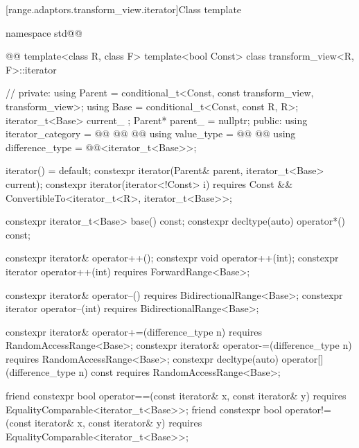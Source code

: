 [range.adaptors.transform_view.iterator]{Class template }

\pnum
{}

\begin{codeblock}
namespace std@@ { @@
  template<class R, class F>
  template<bool Const>
  class transform_view<R, F>::iterator { // \expos
  private:
    using Parent = conditional_t<Const, const transform_view, transform_view>;
    using Base   = conditional_t<Const, const R, R>;
    iterator_t<Base> current_ {};
    Parent* parent_ = nullptr;
  public:
    using iterator_category =
      @@
      @@
    @@
    using value_type        =
      @@
      @@
    using difference_type   = @@<iterator_t<Base>>;

    iterator() = default;
    constexpr iterator(Parent& parent, iterator_t<Base> current);
    constexpr iterator(iterator<!Const> i)
      requires Const && ConvertibleTo<iterator_t<R>, iterator_t<Base>>;

    constexpr iterator_t<Base> base() const;
    constexpr decltype(auto) operator*() const;

    constexpr iterator& operator++();
    constexpr void operator++(int);
    constexpr iterator operator++(int) requires ForwardRange<Base>;

    constexpr iterator& operator--() requires BidirectionalRange<Base>;
    constexpr iterator operator--(int) requires BidirectionalRange<Base>;

    constexpr iterator& operator+=(difference_type n)
      requires RandomAccessRange<Base>;
    constexpr iterator& operator-=(difference_type n)
      requires RandomAccessRange<Base>;
    constexpr decltype(auto) operator[](difference_type n) const
      requires RandomAccessRange<Base>;

    friend constexpr bool operator==(const iterator& x, const iterator& y)
      requires EqualityComparable<iterator_t<Base>>;
    friend constexpr bool operator!=(const iterator& x, const iterator& y)
      requires EqualityComparable<iterator_t<Base>>;

}}
\end{codeblock}
